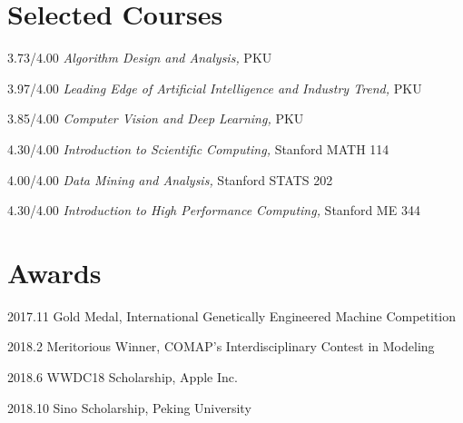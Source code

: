 \documentclass{academiccv}
\begin{document}
\newpage

\section*{Selected Courses}

\begin{tablist}

\item[3.73/4.00] \tab \emph{Algorithm Design and Analysis}\emph, PKU
\item[3.97/4.00] \tab  \emph{Leading Edge of Artificial Intelligence and Industry Trend}\emph, PKU
\item[3.85/4.00] \tab \emph{Computer Vision and Deep Learning}\emph, PKU
\item[4.30/4.00] \tab \emph{Introduction to Scientific Computing}\emph, Stanford MATH 114

\item[4.00/4.00] \tab \emph{Data Mining and Analysis}\emph, Stanford STATS 202

\item[4.30/4.00] \tab \emph{Introduction to High Performance Computing}\emph, Stanford ME 344

\end{tablist}


\section*{Awards}

\begin{tablist}
	\item[2017.11] \tab Gold Medal, International Genetically Engineered Machine Competition

	\item[2018.2] \tab Meritorious Winner, COMAP's Interdisciplinary Contest in Modeling

	\item[2018.6] \tab WWDC18 Scholarship, Apple Inc.
	
	\item[2018.10] \tab Sino Scholarship, Peking University

	\end{tablist}
\end{document}
